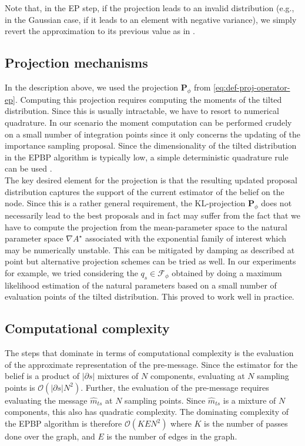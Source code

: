 Note that, in the EP step, if the projection leads to an invalid distribution (e.g., in the Gaussian case, if it leads to an element with negative variance), we simply revert the approximation to its previous value as in \citet{minka01}. 

\subsection{Projection mechanisms}

In the description above, we used the projection $\mathbf P_{\phi}$ from \ref{eq:def-proj-operator-ep}. 
Computing this projection requires computing the moments of the tilted distribution. 
Since this is usually intractable, we have to resort to numerical quadrature. 
In our scenario the moment computation can be performed crudely on a small number of integration points since it only concerns the updating of the importance sampling proposal. 
Since the dimensionality of the tilted distribution in the EPBP algorithm is typically low, a simple deterministic quadrature rule can be used \citep{davis75}. \\

The key desired element for the projection is that the resulting updated proposal distribution captures the support of the current estimator of the belief on the node. Since this is a rather general requirement, the KL-projection $\mathbf P_{\phi}$ does not necessarily lead to the best proposals and in fact may suffer from the fact that we have to compute the projection from the mean-parameter space to the natural parameter space $\nabla A^{\star}$ associated with the exponential family of interest which may be numerically unstable.  
This can be mitigated by damping as described at point  but alternative projection schemes can be tried as well.
In our experiments for example, we tried considering the $q_{s}\in\mathcal F_{\phi}$ obtained by doing a maximum likelihood estimation of the natural parameters based on a small number of evaluation points of the tilted distribution. This proved to work well in practice.

\subsection{\label{sec:EPBP-compcompl}Computational complexity}
The steps that dominate in terms of computational complexity is the evaluation of the approximate representation of the pre-message.
Since the estimator for the belief is a product of $|\partial s|$ mixtures of $N$ components, evaluating at $N$ sampling points is $\mathcal O(|\partial s|N^{2})$. 
Further, the evaluation of the pre-message requires evaluating the message $\widehat m_{ts}$ at $N$ sampling points. Since $\widehat m_{ts}$ is a mixture of $N$ components, this also has quadratic complexity. The dominating complexity of the EPBP algorithm is therefore $\mathcal O(KEN^{2})$ where $K$ is the number of passes done over the graph, and $E$ is the number of edges in the graph.


